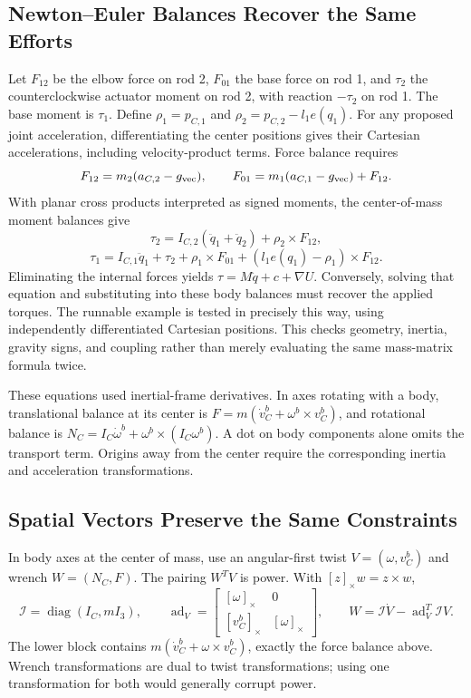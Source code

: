 \subsection{Newton--Euler Balances Recover the Same Efforts}

Let $F_{12}$ be the elbow force on rod 2, $F_{01}$ the base force on rod 1, and $\tau_2$ the counterclockwise actuator moment on rod 2, with reaction $-\tau_2$ on rod 1. The base moment is $\tau_1$. Define $\rho_1=p_{C,1}$ and $\rho_2=p_{C,2}-l_1e(q_1)$. For any proposed joint acceleration, differentiating the center positions gives their Cartesian accelerations, including velocity-product terms. Force balance requires
\begin{equation}
F_{12}=m_2(a_{C,2}-g_{\rm vec}),\qquad
F_{01}=m_1(a_{C,1}-g_{\rm vec})+F_{12}.
\end{equation}
With planar cross products interpreted as signed moments, the center-of-mass moment balances give
\begin{equation}
\tau_2=I_{C,2}(\ddot q_1+\ddot q_2)+\rho_2\times F_{12},
\end{equation}
\begin{equation}
\tau_1=I_{C,1}\ddot q_1+\tau_2+
\rho_1\times F_{01}+(l_1e(q_1)-\rho_1)\times F_{12}.
\end{equation}
Eliminating the internal forces yields $\tau=M\ddot q+c+\nabla U$. Conversely, solving that equation and substituting into these body balances must recover the applied torques. The runnable example is tested in precisely this way, using independently differentiated Cartesian positions. This checks geometry, inertia, gravity signs, and coupling rather than merely evaluating the same mass-matrix formula twice.

These equations used inertial-frame derivatives. In axes rotating with a body, translational balance at its center is $F=m(\dot v_C^b+\omega^b\times v_C^b)$, and rotational balance is $N_C=I_C\dot\omega^b+\omega^b\times(I_C\omega^b)$. A dot on body components alone omits the transport term. Origins away from the center require the corresponding inertia and acceleration transformations.

\subsection{Spatial Vectors Preserve the Same Constraints}

In body axes at the center of mass, use an angular-first twist $V=(\omega,v_C^b)$ and wrench $W=(N_C,F)$. The pairing $W^TV$ is power. With $[z]_\times w=z\times w$,
\begin{equation}
\mathcal I=\operatorname{diag}(I_C,mI_3),\qquad
\operatorname{ad}_V=\begin{bmatrix}[\omega]_\times&0\\{}[v_C^b]_\times&[\omega]_\times\end{bmatrix},
\qquad W=\mathcal I\dot V-\operatorname{ad}_V^T\mathcal I V.
\end{equation}
The lower block contains $m(\dot v_C^b+\omega\times v_C^b)$, exactly the force balance above. Wrench transformations are dual to twist transformations; using one transformation for both would generally corrupt power.

